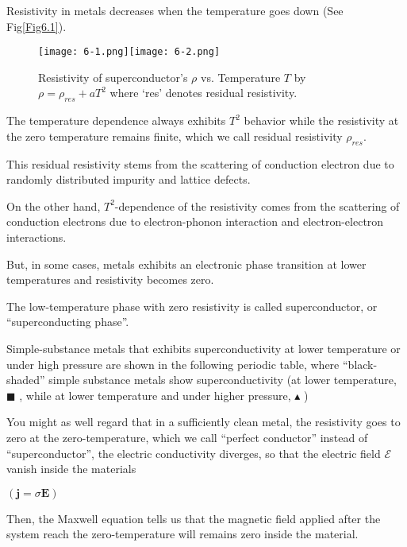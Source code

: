 ﻿\documentclass[twoside]{book}
\numberwithin{equation}{section}
\begin{document}
Resistivity in metals decreases when the temperature goes down (See Fig{\ref{Fig6.1}}).

\begin{figure}
\begin{center}
\texttt{[image: 6-1.png]}\label{Fig6.1}\texttt{[image: 6-2.png]}\label{Fig6.2}
\caption{Resistivity $\rho$ vs. Temperature $T$ by $\rho = \rho_{res} + aT^2$ where `res' denotes residual resistivity. } \caption{Resistivity of superconductor's $\rho$ vs. Temperature $T$ by $\rho = \rho_{res} + aT^2$ where `res' denotes residual resistivity. } 
\end{center}
\end{figure}
The temperature dependence always exhibits $T^2$ behavior while the resistivity at the zero temperature remains finite, which we call residual resistivity $\rho_{res}$.
    
This residual resistivity stems from the scattering of conduction electron due to randomly distributed impurity and lattice defects. 
    
On the other hand, $T^2$-dependence of the resistivity comes from the scattering of conduction electrons due to electron-phonon interaction and electron-electron interactions. 
    
But, in some cases, metals exhibits an electronic phase transition at lower temperatures and resistivity becomes zero. 

The low-temperature phase with zero resistivity is called superconductor, or ``superconducting phase''. 

Simple-substance metals that exhibits superconductivity at lower temperature or under high pressure are shown in the following periodic table, where ``black-shaded'' simple substance metals show superconductivity (at lower temperature, $\blacksquare$ , while at lower temperature and under higher pressure, $\blacktriangle$ )

You might as well regard that in a sufficiently clean metal, the resistivity goes to zero at the zero-temperature, which we call ``perfect conductor'' instead of ``superconductor'', the electric conductivity diverges, so that the electric field $\mathscr{E}$ vanish inside the materials 

\noindent $(\bm{j} = \sigma \bm{E}) $

Then, the Maxwell equation tells us that the magnetic field {} applied after the system reach the zero-temperature will remains zero inside the material. 
\end{document}
